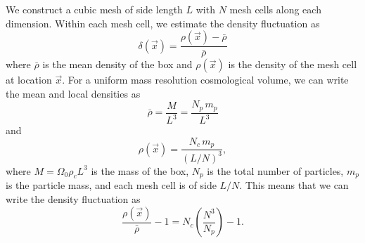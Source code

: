 We construct a cubic mesh of side length $L$ with $N$ mesh cells along each dimension.
Within each mesh cell, we estimate the density fluctuation as
\begin{equation}
  \delta(\vec{x})=\frac{\rho(\vec{x})-\bar{\rho}}{\bar{\rho}}
\end{equation}
where $\bar{\rho}$ is the mean density of the box and $\rho(\vec{x})$ is the density
of the mesh cell at location $\vec{x}$. For a uniform mass resolution cosmological
volume, we can write the mean and local densities as
\begin{equation}
  \bar{\rho}=\frac{M}{L^3}=\frac{N_p\,m_p}{L^3}
\end{equation}
and
\begin{equation}
  \rho(\vec{x})=\frac{N_c\,m_p}{(L/N)^3},
\end{equation}
where $M=\Omega_0\rho_cL^3$ is the mass of the box, $N_p$ is the total number of
particles, $m_p$ is the particle mass, and each mesh cell is of side $L/N$. This means
that we can write the density fluctuation as
\begin{equation}
  \frac{\rho(\vec{x})}{\bar{\rho}}-1=N_c \left(\frac{N^3}{N_p}\right)-1.
\end{equation}



